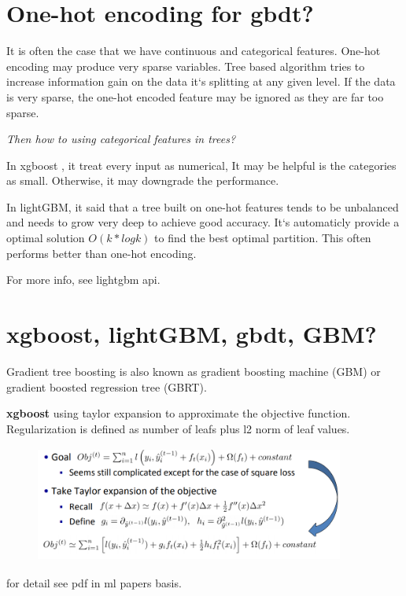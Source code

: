 \documentclass{article}
\begin{document}
\section{One-hot encoding for gbdt?}

It is often the case that we have continuous and categorical features. One-hot encoding may produce very sparse variables. Tree based algorithm tries to increase information gain on the data it`s splitting at any given level. If the data is very sparse, the one-hot encoded feature may be ignored as they are far too sparse. 

\textit{Then how to using categorical features  in trees?} 

In xgboost \cite{DBLP:conf/kdd/ChenG16}, it treat every input as numerical, It may be helpful is the categories as small. Otherwise, it may downgrade the performance. 

In lightGBM, it said that a tree built on one-hot features tends to be unbalanced and needs to grow very deep to achieve good accuracy. It`s automaticly provide a optimal solution $O(k*logk)$ to find the best optimal partition. This often performs better than one-hot encoding. 

For more info, see lightgbm api.

\section{xgboost, lightGBM, gbdt, GBM?}

Gradient tree boosting is also known as gradient boosting machine (GBM) or gradient boosted regression tree (GBRT). 

\textbf{xgboost} using taylor expansion to approximate the objective function. Regularization is defined as number of leafs plus l2 norm of leaf values.
 
\begin{figure}[H]
\centering
\includegraphics[width=4in,height=1.5in]{taylor}
\caption{}
\end{figure}

for detail see pdf in ml papers basis.
\end{document}
